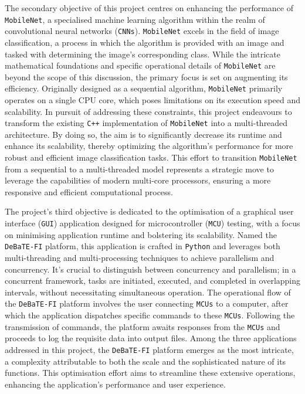 \documentclass[12pt, openany]{book}
\begin{document}
The secondary objective of this project centres on enhancing the performance of \texttt{MobileNet}, a specialised machine learning algorithm within the realm of convolutional neural networks (\texttt{CNNs})\cite{mobilenet_paper}. \texttt{MobileNet} excels in the field of image classification, a process in which the algorithm is provided with an image and tasked with determining the image's corresponding class. While the intricate mathematical foundations and specific operational details of \texttt{MobileNet} are beyond the scope of this discussion, the primary focus is set on augmenting its efficiency. Originally designed as a sequential algorithm, \texttt{MobileNet} primarily operates on a single CPU core, which poses limitations on its execution speed and scalability. In pursuit of addressing these constraints, this project endeavours to transform the existing \texttt{C++} implementation of \texttt{MobileNet}\cite{mobilenet_repo} into a multi-threaded architecture. By doing so, the aim is to significantly decrease its runtime and enhance its scalability, thereby optimizing the algorithm's performance for more robust and efficient image classification tasks. This effort to transition \texttt{MobileNet} from a sequential to a multi-threaded model represents a strategic move to leverage the capabilities of modern multi-core processors, ensuring a more responsive and efficient computational process.

The project's third objective is dedicated to the optimisation of a graphical user interface (\texttt{GUI}) application designed for microcontroller (\texttt{MCU}) testing, with a focus on minimising application runtime and bolstering its scalability. Named the \texttt{DeBaTE-FI} platform\cite{debate_fi_publication}, this application is crafted in \texttt{Python} and leverages both multi-threading and multi-processing techniques to achieve parallelism and concurrency. It's crucial to distinguish between concurrency and parallelism; in a concurrent framework, tasks are initiated, executed, and completed in overlapping intervals, without necessitating simultaneous operation. The operational flow of the \texttt{DeBaTE-FI} platform involves the user connecting \texttt{MCUs} to a computer, after which the application dispatches specific commands to these \texttt{MCUs}. Following the transmission of commands, the platform awaits responses from the \texttt{MCUs} and proceeds to log the requisite data into output files. Among the three applications addressed in this project, the \texttt{DeBaTE-FI} platform emerges as the most intricate, a complexity attributable to both the scale and the sophisticated nature of its functions. This optimisation effort aims to streamline these extensive operations, enhancing the application's performance and user experience.
\end{document}
